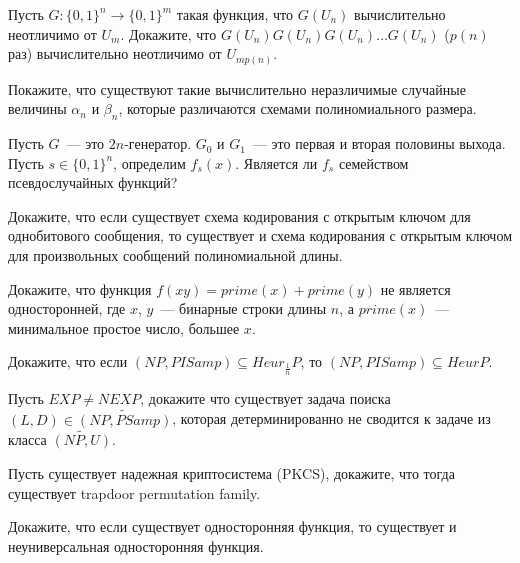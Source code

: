 \setcounter{curtask}{29}


\begin{task}
    Пусть $G: \{0, 1\}^{n} \rightarrow \{0, 1\}^{m}$ такая функция, что $G(U_n)$
    вычислительно неотличимо от $U_m$. Докажите, что $G(U_n)G(U_n)G(U_n) \dots
    G(U_n)$ ($p(n)$ раз) вычислительно неотличимо от $U_{m p(n)}$.
\end{task}

\begin{task}
    Покажите, что существуют такие вычислительно неразличимые случайные величины
    $\alpha_n$ и $\beta_n$, которые различаются схемами полиномиального размера.
\end{task}

\begin{task}
    Пусть $G$~--- это $2n$-генератор. $G_0$ и $G_1$~--- это первая и вторая половины
    выхода. Пусть $s \in \{0, 1\}^n$, определим $f_s(x)$. Является ли $f_s$
    семейством псевдослучайных функций?
\end{task}

\begin{task}
    Докажите, что если существует схема кодирования с открытым ключом для
    однобитового сообщения, то существует и схема кодирования с открытым ключом для
    произвольных сообщений полиномиальной длины.
\end{task}

\breakline

\begin{ptask}{12}
    Докажите, что функция $f(xy) = prime(x) + prime(y)$ не является односторонней,
    где $x$, $y$~--- бинарные строки длины $n$, а $prime(x)$~--- минимальное простое
    число, большее $x$.
\end{ptask}

\begin{ptask}{21}
    Докажите, что если $(NP, PISamp) \subseteq Heur_{\frac{1}{n}}P$, то $(NP, PISamp)
    \subseteq HeurP$.
\end{ptask}

\begin{ptask}{22}
    Пусть $EXP \neq NEXP$, докажите что существует задача поиска $(L, D) \in
    \widetilde{(NP, PSamp)}$,
    которая детерминированно не сводится к задаче из класса $\widetilde{(NP, U)}$.
\end{ptask}

\begin{ptask}{27}
    Пусть существует надежная криптосистема (PKCS), докажите, что тогда существует
    trapdoor permutation family.
\end{ptask}

\begin{ptask}{28}
    Докажите, что если существует односторонняя функция, то существует и
    неуниверсальная односторонняя функция.
\end{ptask}
